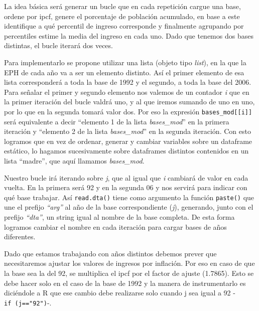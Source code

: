 \documentclass[
]{book}
\begin{document}
La idea básica será generar un bucle que en cada repetición cargue una base, ordene por ipcf, genere el porcentaje de población acumulado, en base a este identifique a qué percentil de ingreso corresponde y finalmente agrupando por percentiles estime la media del ingreso en cada uno. Dado que tenemos dos bases distintas, el bucle iterará dos veces.

Para implementarlo se propone utilizar una lista (objeto tipo \emph{list}), en la que la EPH de cada año va a ser un elemento distinto. Así el primer elemento de esa lista corresponderá a toda la base de 1992 y el segundo, a toda la base del 2006. Para señalar el primer y segundo elemento nos valemos de un contador \emph{i} que en la primer iteración del bucle valdrá uno, y al que iremos sumando de uno en uno, por lo que en la segunda tomará valor dos. Por eso la expresión \texttt{bases\_mod{[}{[}i{]}{]}} será equivalente a decir ``elemento 1 de la lista \emph{bases\_mod}'' en la primera iteración y ``elemento 2 de la lista \emph{bases\_mod}'' en la segunda iteración. Con esto logramos que en vez de ordenar, generar y cambiar variables sobre un dataframe estático, lo hagamos sucesivamente sobre dataframes distintos contenidos en un lista ``madre'', que aquí llamamos \emph{bases\_mod}.

Nuestro bucle irá iterando sobre \emph{j}, que al igual que \emph{i} cambiará de valor en cada vuelta. En la primera será 92 y en la segunda 06 y nos servirá para indicar con qué base trabajar. Así \texttt{read.dta()} tiene como argumento la función \texttt{paste()} que une el prefijo \emph{``arg''} al año de la base correspondiente (\emph{j}), generando, junto con el prefijo \emph{``dta''}, un string igual al nombre de la base completa. De esta forma logramos cambiar el nombre en cada iteración para cargar bases de años diferentes.

Dado que estamos trabajando con años distintos debemos prever que necesitaremos ajustar los valores de ingresos por inflación. Por eso en caso de que la base sea la del 92, se multiplica el ipcf por el factor de ajuste (1.7865). Esto se debe hacer solo en el caso de la base de 1992 y la manera de instrumentarlo es diciéndole a R que ese cambio debe realizarse solo cuando j sea igual a 92 -\texttt{if\ (j=="92")}-.
\end{document}
